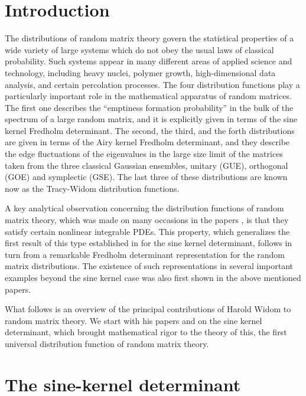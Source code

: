 \documentclass[11pt,letterpaper,reqno]{amsart}
\theoremstyle{definition}
\theoremstyle{remark}
\numberwithin{equation}{section}
\begin{document}
\section{Introduction}
The distributions of random matrix theory govern  the
statistical properties of  a wide variety of  large systems which  do not  obey the usual
laws of classical probability. Such systems appear in
many different areas of applied science and technology, including
heavy nuclei, polymer growth, high-dimensional data  analysis, and
certain percolation processes. The four distribution functions play
a particularly important  role in the mathematical apparatus of random matrices. The first one describes the
``emptiness formation probability'' in the bulk of the spectrum of a large random matrix,
and it is explicitly given in terms of the  sine kernel Fredholm determinant.
The second, the third, and the forth  distributions  are given in terms of the Airy kernel
Fredholm determinant, and they describe the edge fluctuations
of the eigenvalues in the large size limit of the matrices taken from the three
classical Gaussian ensembles, unitary (GUE), orthogonal (GOE) and symplectic (GSE).
The last  three of these distributions are known now as the Tracy-Widom
distribution functions.

A key analytical observation concerning the
distribution functions of random matrix theory, which was made on many occasions in the papers
\cite{74,75,80,84,95,96}, is that they satisfy certain nonlinear integrable PDEs.
This property, which  generalizes the  first result of this type established in \cite{ JMMS}
for the sine kernel determinant,  follows in turn  from a remarkable Fredholm determinant
representation for the random matrix distributions. The  existence of such representations
in several important examples  beyond the sine kernel case  was also first shown in the above mentioned
papers.

What follows is an  overview of the principal contributions of Harold Widom to random matrix theory. We start
with his papers \cite{72} and \cite{83} on the sine kernel determinant, which brought  mathematical rigor to the
theory of this, the first universal distribution function of random matrix theory.


\section{The sine-kernel determinant}
\end{document}
